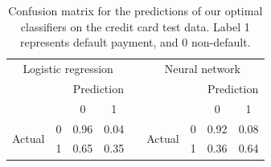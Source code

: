 \begin{table}[!h]
\caption{Confusion matrix for the predictions of our optimal classifiers on the credit card test data. Label 1 represents default payment, and 0 non-default.}
\label{tab:confusion_logreg}
\begin{tabular}{ccccccccc}
\multicolumn{4}{c}{Logistic regression}                                                                                        &                       & \multicolumn{4}{c}{Neural network}                                                                                            \\ \cline{1-4} \cline{6-9} 
\multicolumn{1}{|c}{}                         & \multicolumn{1}{c|}{}  & \multicolumn{2}{c|}{Prediction}                       & \multicolumn{1}{c|}{} &                                              & \multicolumn{1}{c|}{}  & \multicolumn{2}{c|}{Prediction}                       \\ \cline{3-4} \cline{8-9} 
\multicolumn{1}{|c}{}                         & \multicolumn{1}{c|}{}  & \multicolumn{1}{c|}{0}    & \multicolumn{1}{c|}{1}    & \multicolumn{1}{c|}{} &                                              & \multicolumn{1}{c|}{}  & \multicolumn{1}{c|}{0}    & \multicolumn{1}{c|}{1}    \\ \cline{1-4} \cline{6-9} 
\multicolumn{1}{|c|}{\multirow{2}{*}{Actual}} & \multicolumn{1}{c|}{0} & \multicolumn{1}{c|}{0.96} & \multicolumn{1}{c|}{0.04} & \multicolumn{1}{c|}{} & \multicolumn{1}{c|}{\multirow{2}{*}{Actual}} & \multicolumn{1}{c|}{0} & \multicolumn{1}{c|}{0.92} & \multicolumn{1}{c|}{0.08} \\ \cline{2-4} \cline{7-9} 
\multicolumn{1}{|c|}{}                        & \multicolumn{1}{c|}{1} & \multicolumn{1}{c|}{0.65} & \multicolumn{1}{c|}{0.35} & \multicolumn{1}{c|}{} & \multicolumn{1}{c|}{}                        & \multicolumn{1}{c|}{1} & \multicolumn{1}{c|}{0.36} & \multicolumn{1}{c|}{0.64} \\ \cline{1-4} \cline{6-9} 
\end{tabular}
\end{table}

